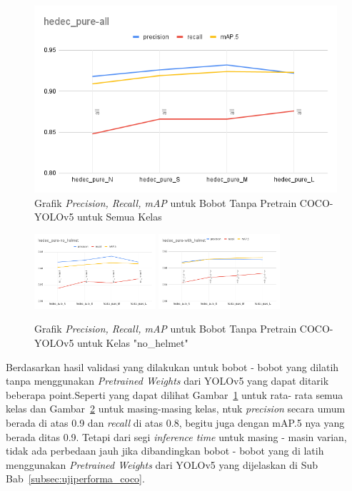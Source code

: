\begin{figure} [h!]
  \centering
  \includegraphics[width=1\textwidth]{gambar/final_weight_val/hedec_pure-all.png}
  \caption{Grafik \emph{Precision, Recall, mAP} untuk Bobot Tanpa Pretrain COCO-YOLOv5 untuk Semua Kelas}
  \label{fig:grafval_pure_all}  
\end{figure}

\begin{figure} [h!]
  \centering
  \includegraphics[width=0.4\textwidth]{gambar/final_weight_val/hedec_pure-no_helmet.png}
  \includegraphics[width=0.4\textwidth]{gambar/final_weight_val/hedec_pure-with_helmet.png}
  \caption{Grafik \emph{Precision, Recall, mAP} untuk Bobot Tanpa Pretrain COCO-YOLOv5 untuk Kelas "no\_helmet"}
  \label{fig:grafval_pure_eachclass}  
\end{figure}

 
\newpage
\par Berdasarkan hasil validasi yang dilakukan untuk bobot - bobot yang dilatih tanpa menggunakan \emph{Pretrained Weights} dari YOLOv5
yang dapat ditarik beberapa point.Seperti yang dapat dilihat Gambar~\ref{fig:grafval_pure_all} untuk rata- rata semua kelas
dan Gambar~\ref{fig:grafval_pure_eachclass} untuk masing-masing kelas, ntuk \emph{precision} secara umum berada di atas 0.9 dan \emph{recall} di atas 0.8, begitu juga dengan
mAP.5 nya yang berada ditas 0.9. Tetapi dari segi \emph{inference time} untuk masing - masin varian, tidak ada perbedaan jauh jika dibandingkan
bobot - bobot yang di latih menggunakan \emph{Pretrained Weights} dari YOLOv5 yang dijelaskan di Sub Bab~\ref{subsec:ujiperforma_coco}.

